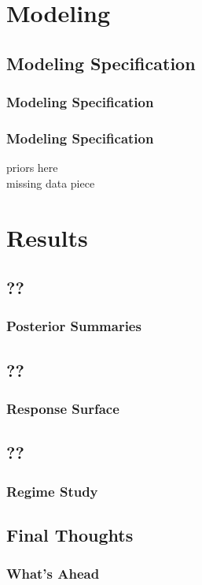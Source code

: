 \documentclass{beamer}
\begin{document}
\section{Modeling}
\subsection{Modeling Specification}
\begin{frame}
	\frametitle{Modeling Specification}

\end{frame}
\begin{frame}
	\frametitle{Modeling Specification}
	priors here \\
	missing data piece
\end{frame}
\section{Results}
\subsection{??}
\begin{frame}
	\frametitle{Posterior Summaries}

\end{frame}
\subsection{??}
\begin{frame}
	\frametitle{Response Surface}

\end{frame}
\subsection{??}
\begin{frame}
	\frametitle{Regime Study}

\end{frame}


\subsection{Final Thoughts}
\begin{frame}
	\frametitle{What's Ahead}

\end{frame}
\end{document}
